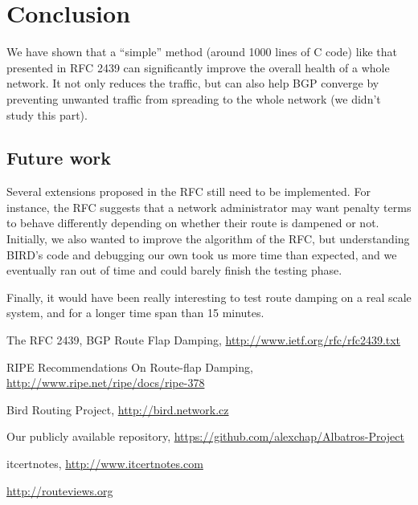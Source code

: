 \documentclass[a4paper,english]{IEEEtran}
\begin{document}
\section{Conclusion}

We have shown that a ``simple'' method (around 1000 lines of C code) like that presented in RFC 2439 can significantly improve the overall health of a whole network.
It not only reduces the traffic, but can also help BGP converge by preventing unwanted traffic from spreading to the whole network (we didn't study this part).

\subsection{Future work}

Several extensions proposed in the RFC still need to be implemented.
For instance, the RFC suggests that a network administrator may want penalty terms to behave differently depending on whether their route is dampened or not.
Initially, we also wanted to improve the algorithm of the RFC, but understanding BIRD's code and debugging our own took us more time than expected, and we eventually ran out of time and could barely finish the testing phase.

Finally, it would have been really interesting to test route damping on a real scale system, and for a longer time span than 15 minutes.

\begin{thebibliography}{6}

The RFC 2439, BGP Route Flap Damping, \href{http://www.ietf.org/rfc/rfc2439.txt}{http://www.ietf.org/rfc/rfc2439.txt}

 RIPE Recommendations On Route-flap
Damping, \href{http://www.ripe.net/ripe/docs/ripe-378}{http://www.ripe.net/ripe/docs/ripe-378}

Bird Routing Project, \href{http://bird.network.cz}{http://bird.network.cz}

Our publicly available repository, \href{https://github.com/alexchap/Albatros-Project}{https://github.com/alexchap/Albatros-Project}

itcertnotes, \href{www.itcertnotes.com}{http://www.itcertnotes.com}

\href{http://routeviews.org}{http://routeviews.org} 

\end{thebibliography}
\end{document}
